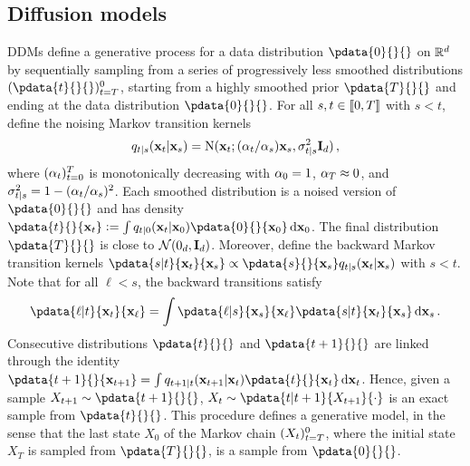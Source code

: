 \subsection{Diffusion models} 
\label{sec:diffusion}
DDMs define a generative process for a data distribution $\pdata{0}{}{}$ on $\mathbb{R}^d$ by sequentially sampling from a series of progressively less smoothed distributions $(\pdata{t}{}{})_{t=T}^0$, starting from a highly smoothed prior $\pdata{T}{}{}$ and ending at the data distribution $\pdata{0}{}{}$. For all $s, t \in \llbracket 0, T \rrbracket$ with $s < t$, define the noising Markov transition kernels 
\begin{equation}
\fw{t|s}{\bx_s}{\bx_t} = \normpdf(\bx_t; (\a_t / \a_s) \bx_s, \std^2 _{t|s} \Id_\dimx) \eqsp,
\label{eq:def_gauss_transition}
\end{equation} 
where $(\alpha_t)_{t = 0}^T$ is monotonically decreasing with $\alpha_0 = 1$, $\alpha_T \approx 0$, and $\sigma^2 _{\smash{t|s}} = 1 - (\alpha_t / \alpha_s)^2$. 
Each smoothed distribution is a noised version of $\pdata{0}{}{}$ and has density  
$\pdata{t}{}{\bx_t} \eqdef \int \fw{t|0}{\bx_0}{\bx_t} \pdata{0}{}{\bx_0} \, \rmd \bx_0$. The final distribution $\pdata{T}{}{}$ is close to $\mathcal{N}(0_{d}, \mathbf{I}_{d})$.   Moreover, define the backward Markov transition kernels $\pdata{s|t}{\bx_t}{\bx_s} \propto \pdata{s}{}{\bx_s} \fw{t|s}{\bx_s}{\bx_t}$ with $s < t$.
Note that for all $\ell < s$, the backward transitions satisfy 
\begin{equation}
\label{eq:back_chapman}
\pdata{\ell|t}{\bx_t}{\bx_\ell} = \int \pdata{\ell|s}{\bx_s}{\bx_\ell} \pdata{s|t}{\bx_t}{\bx_s} \, \rmd \bx_s \eqsp.
\end{equation}
Consecutive distributions $\pdata{t}{}{}$ and $\pdata{t+1}{}{}$ are linked through the identity $\pdata{t+1}{}{\bx_{t+1}} = \int \fw{t+1|t}{\bx_t}{\bx_{t+1}} \pdata{t}{}{\bx_t} \, \rmd \bx_t$. 
Hence, given a sample $\bX_{t+1} \sim \pdata{t+1}{}{}$, $\bX_t \sim \pdata{t|t+1}{\bX_{t+1}}{\cdot}$ is an exact sample from $\pdata{t}{}{}$. 
This procedure defines a generative model, in the sense that the last state $X_0$ of the Markov chain $(X_{t})_{t = T} ^0$,  where the initial state $X_T$ is sampled from $\pdata{T}{}{}$, is a sample from $\pdata{0}{}{}$.

